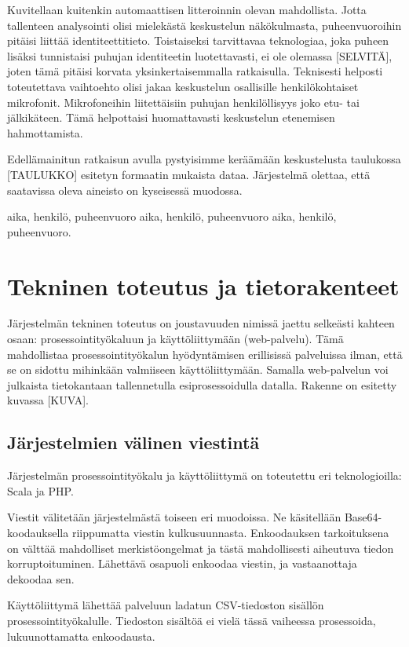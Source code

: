 \documentclass[11pt,a4paper,oneside]{memoir}
\begin{document}
Kuvitellaan kuitenkin automaattisen litteroinnin olevan mahdollista. Jotta tallenteen analysointi olisi mielekästä keskustelun näkökulmasta, puheenvuoroihin pitäisi liittää identiteettitieto. Toistaiseksi tarvittavaa teknologiaa, joka puheen lisäksi tunnistaisi puhujan identiteetin luotettavasti, ei ole olemassa [SELVITÄ], joten tämä pitäisi korvata yksinkertaisemmalla ratkaisulla. Teknisesti helposti toteutettava vaihtoehto olisi jakaa keskustelun osallisille henkilökohtaiset mikrofonit. Mikrofoneihin liitettäisiin puhujan henkilöllisyys joko etu- tai jälkikäteen. Tämä helpottaisi huomattavasti keskustelun etenemisen hahmottamista.

Edellämainitun ratkaisun avulla pystyisimme keräämään keskustelusta taulukossa [TAULUKKO] esitetyn formaatin mukaista dataa. Järjestelmä olettaa, että saatavissa oleva aineisto on kyseisessä muodossa.

aika, henkilö, puheenvuoro
aika, henkilö, puheenvuoro
aika, henkilö, puheenvuoro.

\chapter{Tekninen toteutus ja tietorakenteet}
Järjestelmän tekninen toteutus on joustavuuden nimissä jaettu selkeästi kahteen osaan: prosessointityökaluun ja käyttöliittymään (web-palvelu). Tämä mahdollistaa prosessointityökalun hyödyntämisen erillisissä palveluissa ilman, että se on sidottu mihinkään valmiiseen käyttöliittymään. Samalla web-palvelun voi julkaista tietokantaan tallennetulla esiprosessoidulla datalla. Rakenne on esitetty kuvassa [KUVA].

\section{Järjestelmien välinen viestintä}
Järjestelmän prosessointityökalu ja käyttöliittymä on toteutettu eri teknologioilla: Scala ja PHP.

Viestit välitetään järjestelmästä toiseen eri muodoissa. Ne käsitellään Base64-koodauksella riippumatta viestin kulkusuunnasta. Enkoodauksen tarkoituksena on välttää mahdolliset merkistöongelmat ja tästä mahdollisesti aiheutuva tiedon korruptoituminen. Lähettävä osapuoli enkoodaa viestin, ja vastaanottaja dekoodaa sen.

Käyttöliittymä lähettää palveluun ladatun CSV-tiedoston sisällön prosessointityökalulle. Tiedoston sisältöä ei vielä tässä vaiheessa prosessoida, lukuunottamatta enkoodausta.
\end{document}
